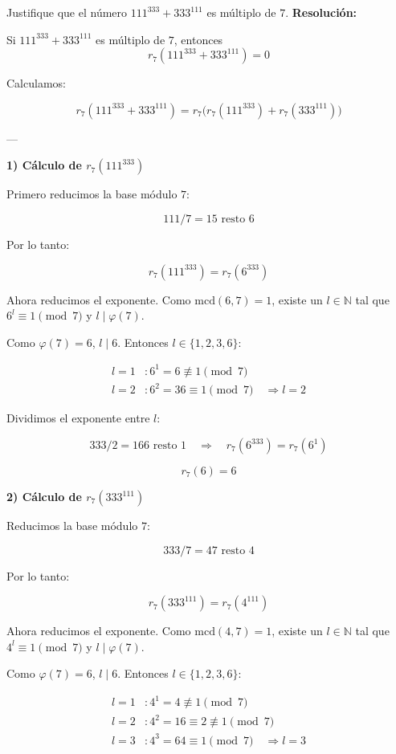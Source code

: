 \documentclass[a4paper,12pt]{article}
\begin{document}
\begin{ejercicio}[title=Ejercicio 29]
Justifique que el número $111^{333} + 333^{111}$ es múltiplo de $7$.
\tcblower
\textbf{Resolución:}

Si $111^{333} + 333^{111}$ es múltiplo de $7$, entonces  
\[
r_7(111^{333} + 333^{111}) = 0
\]

Calculamos:

\[
r_7(111^{333} + 333^{111}) = r_7\big(r_7(111^{333}) + r_7(333^{111})\big)
\]

---

\textbf{1) Cálculo de $r_7(111^{333})$}

Primero reducimos la base módulo $7$:

\[
111 / 7 = 15 \text{ resto } 6
\]

Por lo tanto:

\[
r_7(111^{333}) = r_7(6^{333})
\]

Ahora reducimos el exponente.  
Como $\mathrm{mcd}(6,7) = 1$, existe un $l \in \mathbb{N}$ tal que $6^l \equiv 1 \pmod{7}$ y $l \mid \varphi(7)$.

\vspace{0.5em}

Como $\varphi(7) = 6$, $l \mid 6$.  
Entonces $l \in \{1,2,3,6\}$:

\[
\begin{aligned}
l = 1 &: 6^1 = 6 \not\equiv 1 \pmod{7} \\
l = 2 &: 6^2 = 36 \equiv 1 \pmod{7} \quad \Rightarrow l = 2
\end{aligned}
\]

Dividimos el exponente entre $l$:

\[
333 / 2 = 166 \text{ resto } 1 \quad \Rightarrow \quad r_7(6^{333}) = r_7(6^1)
\]

\[
r_7(6) = 6
\]


\textbf{2) Cálculo de $r_7(333^{111})$}

Reducimos la base módulo $7$:

\[
333 / 7 = 47 \text{ resto } 4
\]

Por lo tanto:

\[
r_7(333^{111}) = r_7(4^{111})
\]

Ahora reducimos el exponente.  
Como $\mathrm{mcd}(4,7) = 1$, existe un $l \in \mathbb{N}$ tal que $4^l \equiv 1 \pmod{7}$ y $l \mid \varphi(7)$.

\vspace{0.5em}

Como $\varphi(7) = 6$, $l \mid 6$.  
Entonces $l \in \{1,2,3,6\}$:

\[
\begin{aligned}
l = 1 &: 4^1 = 4 \not\equiv 1 \pmod{7} \\
l = 2 &: 4^2 = 16 \equiv 2 \not\equiv 1 \pmod{7} \\
l = 3 &: 4^3 = 64 \equiv 1 \pmod{7} \quad \Rightarrow l = 3
\end{aligned}
\]

\end{ejercicio}
\end{document}
